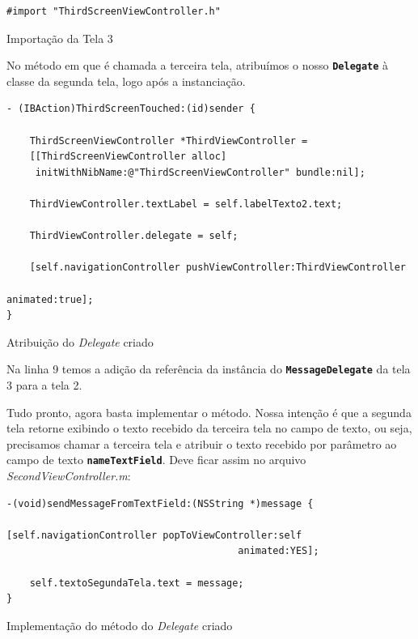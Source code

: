\documentclass[a4paper,12pt,brazil,doubleside]{book}
\begin{document}
\begin{singlespace}
\begin{listing}[H]
\begin{verbatim}
#import "ThirdScreenViewController.h"
\end{verbatim}
\caption{Importação da Tela 3}
\end{listing}


No método em que é chamada a terceira tela, atribuímos o nosso \texttt{\textbf{Delegate}} à classe da segunda tela, logo após a instanciação.

\begin{listing}[H]
\begin{verbatim}
- (IBAction)ThirdScreenTouched:(id)sender {

    ThirdScreenViewController *ThirdViewController =
    [[ThirdScreenViewController alloc]
     initWithNibName:@"ThirdScreenViewController" bundle:nil];
    
    ThirdViewController.textLabel = self.labelTexto2.text;
    
    ThirdViewController.delegate = self;
    
    [self.navigationController pushViewController:ThirdViewController 
    													animated:true];
}
\end{verbatim}
\caption{Atribuição do \emph{Delegate} criado}
\end{listing}


Na linha 9 temos a adição da referência da instância do \texttt{\textbf{MessageDelegate}} da tela 3 para a tela 2.

Tudo pronto, agora basta implementar o método. Nossa intenção é que a segunda tela retorne exibindo o texto recebido da terceira tela no campo de texto, ou seja, precisamos chamar a terceira tela e atribuir o texto recebido por parâmetro ao campo de texto \texttt{\textbf{nameTextField}}. Deve ficar assim no arquivo \emph{SecondViewController.m}:

\begin{listing}[H]
\begin{verbatim}
-(void)sendMessageFromTextField:(NSString *)message { 

[self.navigationController popToViewController:self 
										animated:YES];
										
    self.textoSegundaTela.text = message;
}
\end{verbatim}
\caption{Implementação do método do \emph{Delegate} criado}
\end{listing}



\end{singlespace}
\end{document}
